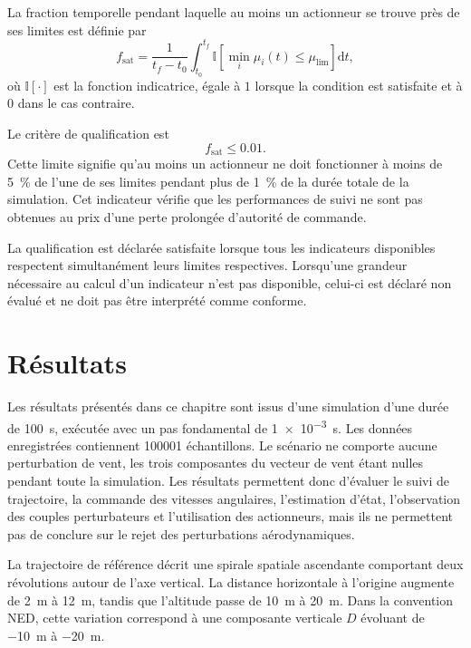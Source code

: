 \documentclass[11pt,a4paper,oneside]{report}
\newcommand{\dd}{\mathrm{d}}
\begin{document}
La fraction temporelle pendant laquelle au moins un actionneur se trouve près de ses limites est définie par
\begin{equation}
	f_{\mathrm{sat}}
	=
	\frac{1}{t_f-t_0}
	\int_{t_0}^{t_f}
	\mathbb{I}
	\left[
	\min_i\mu_i(t)\leq\mu_{\mathrm{lim}}
	\right]
	\dd t,
	\label{eq_actuator_near_limit_fraction}
\end{equation}
où $\mathbb{I}[\cdot]$ est la fonction indicatrice, égale à $1$ lorsque la condition est satisfaite et à $0$ dans le cas contraire.

Le critère de qualification est
\begin{equation}
	f_{\mathrm{sat}}
	\leq
	0.01.
	\label{eq_actuator_fraction_requirement}
\end{equation}
Cette limite signifie qu'au moins un actionneur ne doit fonctionner à moins de \SI{5}{\percent} de l'une de ses limites pendant plus de \SI{1}{\percent} de la durée totale de la simulation. Cet indicateur vérifie que les performances de suivi ne sont pas obtenues au prix d'une perte prolongée d'autorité de commande.

La qualification est déclarée satisfaite lorsque tous les indicateurs disponibles respectent simultanément leurs limites respectives. Lorsqu'une grandeur nécessaire au calcul d'un indicateur n'est pas disponible, celui-ci est déclaré non évalué et ne doit pas être interprété comme conforme.
	
\chapter{Résultats}
\label{chap_results}

Les résultats présentés dans ce chapitre sont issus d'une simulation d'une durée de \SI{100}{s}, exécutée avec un pas fondamental de \SI{1e-3}{s}. Les données enregistrées contiennent \num{100001} échantillons. Le scénario ne comporte aucune perturbation de vent, les trois composantes du vecteur de vent étant nulles pendant toute la simulation. Les résultats permettent donc d'évaluer le suivi de trajectoire, la commande des vitesses angulaires, l'estimation d'état, l'observation des couples perturbateurs et l'utilisation des actionneurs, mais ils ne permettent pas de conclure sur le rejet des perturbations aérodynamiques.

La trajectoire de référence décrit une spirale spatiale ascendante comportant deux révolutions autour de l'axe vertical. La distance horizontale à l'origine augmente de \SI{2}{m} à \SI{12}{m}, tandis que l'altitude passe de \SI{10}{m} à \SI{20}{m}. Dans la convention NED, cette variation correspond à une composante verticale $D$ évoluant de \SI{-10}{m} à \SI{-20}{m}.
\end{document}
